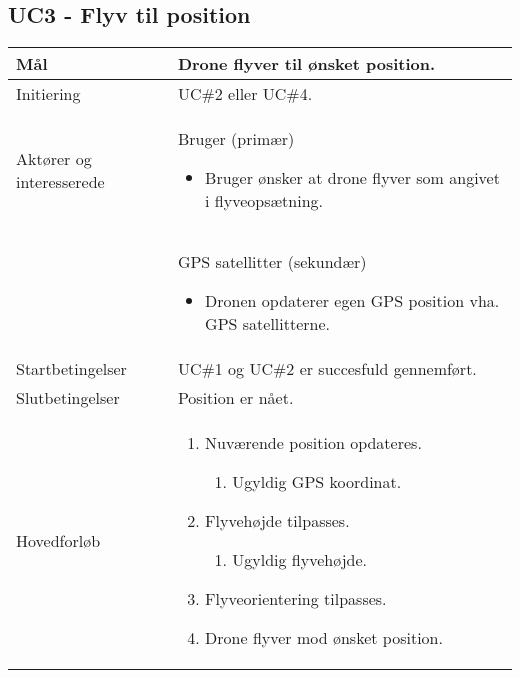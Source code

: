 \subsection*{UC3 - Flyv til position}

\begin{table}[H]
\begin{tabular}{| p{3cm}| p{11.5cm}|}
\hline


Mål	 							& Drone flyver til ønsket position. \\\hline
Initiering 							& UC\#2 eller UC\#4. \\\hline
Aktører og \newline interesserede			& Bruger (primær) 

										\begin{itemize}
											\item Bruger ønsker at drone flyver som angivet i flyveopsætning.
										\end{itemize} \\  
										
										& GPS satellitter (sekundær) 

										\begin{itemize}
											\item Dronen opdaterer egen GPS position vha. GPS satellitterne.
										\end{itemize} \\ \hline
Startbetingelser							& UC\#1 og UC\#2 er succesfuld gennemført. \\\hline
Slutbetingelser						& Position er nået. \\\hline
Hovedforløb				&
 
									\renewcommand{\labelenumi}{\arabic{enumi}.}
									\renewcommand{\labelenumii}{\Roman{enumii}:}

									\begin{enumerate}[topsep=0.0cm, leftmargin=0.5cm]
										\item Nuværende position opdateres.
											\begin{enumerate}[partopsep=4cm, topsep=0cm, leftmargin=1cm]
												\item Ugyldig GPS koordinat.
											\end{enumerate}
										\item Flyvehøjde tilpasses.
											\begin{enumerate}[partopsep=4cm, topsep=0cm, leftmargin=1cm]
												\item Ugyldig flyvehøjde.
											\end{enumerate}
										\item Flyveorientering tilpasses.
										\item Drone flyver mod ønsket position.
									\end{enumerate} \\\hline	


\end{tabular}
\end{table}

